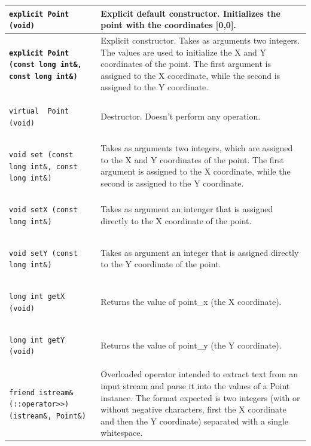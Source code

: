 \documentclass[11pt,twoside,openany,x11names,svgnames]{memoir}
\begin{document}
\begin{table}[h]\footnotesize
\centering
\begin{tabular}{| >{\bfseries}p{9.2cm} | p{6.3cm} |}
	\hline
	
	\texttt{explicit Point (void)} & Explicit default constructor. Initializes the point with the coordinates [0,0]. \\
	
	\hline
	
	\texttt{explicit Point (const long int\&, const long int\&)} & Explicit constructor. Takes as arguments two integers. The values are used to initialize the X and Y coordinates of the point. The first argument is assigned to the X coordinate, while the second is assigned to the Y coordinate. \\
	
	\hline
	
	\texttt{virtual ~Point (void)} & Destructor. Doesn't perform any operation. \\
	
	\hline
	
	\texttt{void set (const long int\&, const long int\&)} & Takes as arguments two integers, which are assigned to the X and Y coordinates of the point. The first argument is assigned to the X coordinate, while the second is assigned to the Y coordinate. \\
	
	\hline
	
	\texttt{void setX (const long int\&)} & Takes as argument an intenger that is assigned directly to the X coordinate of the point. \\
	
	\hline
	
	\texttt{void setY (const long int\&)} & Takes as argument an integer that is assigned directly to the Y coordinate of the point. \\
	
	\hline
	
	\texttt{long int getX (void)} & Returns the value of point\_x (the X coordinate). \\
	
	\hline
	
	\texttt{long int getY (void)} & Returns the value of point\_y (the Y coordinate). \\
	
	\hline
	
	\texttt{friend istream\& (::operator>>) (istream\&, Point\&)} & Overloaded operator intended to extract text from an input stream and parse it into the values of a Point instance. The format expected is two integers (with or without negative characters, first the X coordinate and then the Y coordinate) separated with a single whitespace. \\
	

\end{tabular}
\end{table}
\end{document}
